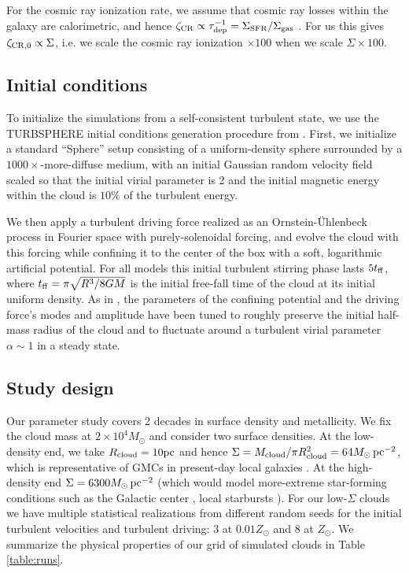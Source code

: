 \documentclass[apjl,twocolumn]{openjournal}
\begin{document}
For the cosmic ray ionization rate, we assume that cosmic ray losses within the galaxy are calorimetric, and hence $\zeta_{\rm CR} \propto \tau_{\rm dep}^{-1} = \Sigma_{\rm SFR} / \Sigma_{\rm gas}$ \citep{krumholz:2023.cosmic.rays}. For us this gives $\zeta_{\rm CR,0} \propto \Sigma$, i.e. we scale the cosmic ray ionization $\times 100$ when we scale $\Sigma \times 100$. 


\subsection{Initial conditions}


To initialize the simulations from a self-consistent turbulent state, we use the \small{TURBSPHERE} initial conditions generation procedure from \citet{lane:2021.turbsphere}. First, we initialize a standard ``Sphere'' setup consisting of a uniform-density sphere surrounded by a $1000\times$-more-diffuse medium, with an initial Gaussian random velocity field scaled so that the initial virial parameter is 2 and the initial magnetic energy within the cloud is $10\%$ of the turbulent energy. 

We then apply a turbulent driving force realized as an Ornstein-\"{U}hlenbeck process in Fourier space \citep{federrath:2008.density.pdf.vs.forcingtype} with purely-solenoidal forcing, and evolve the cloud with this forcing while confining it to the center of the box with a soft, logarithmic artificial potential. For all models this initial turbulent stirring phase lasts $5t_{\rm ff}$, where $t_{\rm ff}=\pi\sqrt{R^3/8GM}$ is the initial free-fall time of the cloud at its initial uniform density. As in \citet{lane:2021.turbsphere}, the parameters of the confining potential and the driving force's modes and amplitude have been tuned to roughly preserve the initial half-mass radius of the cloud and to fluctuate around a turbulent virial parameter $\alpha \sim 1$ in a steady state.

\subsection{Study design}
Our parameter study covers 2 decades in surface density and metallicity. We fix the cloud mass at $2\times 10^{4}M_\odot$ and consider two surface densities. At the low-density end, we take $R_{\rm cloud}=10\rm pc$ and hence $\Sigma = M_{\rm cloud}/\pi R_{\rm cloud}^2 = 64M_\odot\,\rm pc^{-2}$, which is representative of GMCs in present-day local galaxies \citep{heyer:2015.gmcs,lada:2020.sigma.gmc.const}. At the high-density end $\Sigma=6300M_\odot\,\rm pc^{-2}$ (which would model more-extreme star-forming conditions such as the Galactic center \citep{Longmore_2012_the_Brick}, local starbursts \citep{mathews:2018.antennae.sfe}). For our low-$\Sigma$ clouds we have multiple statistical realizations from different random seeds for the initial turbulent velocities and turbulent driving: 3 at $0.01Z_\odot$ and 8 at $Z_\odot$. We summarize the physical properties of our grid of simulated clouds in Table \ref{table:runs}.
\end{document}
